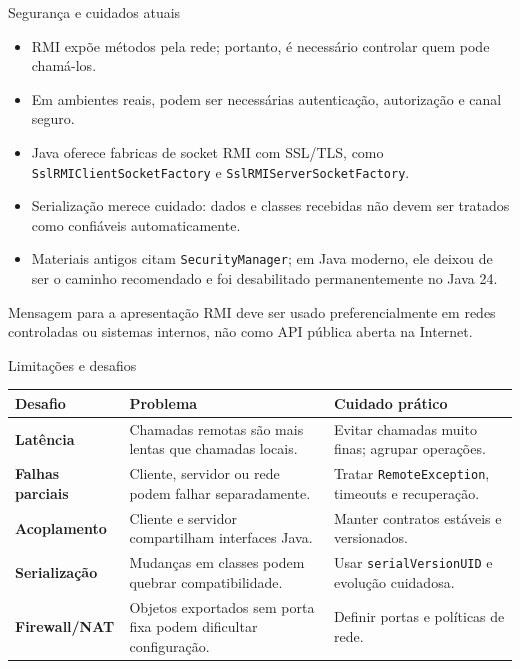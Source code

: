 \documentclass[aspectratio=169]{beamer}
\newcommand{\code}[1]{\texttt{#1}}
\begin{document}
\begin{frame}{Segurança e cuidados atuais}
    \begin{itemize}
        \item RMI expõe métodos pela rede; portanto, é necessário controlar quem pode chamá-los.
        \item Em ambientes reais, podem ser necessárias autenticação, autorização e canal seguro.
        \item Java oferece fabricas de socket RMI com SSL/TLS, como \code{SslRMIClientSocketFactory} e \code{SslRMIServerSocketFactory}.
        \item Serialização merece cuidado: dados e classes recebidas não devem ser tratados como confiáveis automaticamente.
        \item Materiais antigos citam \code{SecurityManager}; em Java moderno, ele deixou de ser o caminho recomendado e foi desabilitado permanentemente no Java 24.
    \end{itemize}

    \vspace{0.25cm}
    \begin{alertblock}{Mensagem para a apresentação}
        RMI deve ser usado preferencialmente em redes controladas ou sistemas internos, não como API pública aberta na Internet.
    \end{alertblock}
\end{frame}

\begin{frame}{Limitações e desafios}
    \begin{table}
        \small
        \renewcommand{\arraystretch}{1.25}
        \begin{tabular}{>{\bfseries}p{3.4cm}p{4.5cm}p{4.5cm}}
            \toprule
            Desafio & Problema & Cuidado prático \\
            \midrule
            Latência & Chamadas remotas são mais lentas que chamadas locais. & Evitar chamadas muito finas; agrupar operações. \\
            Falhas parciais & Cliente, servidor ou rede podem falhar separadamente. & Tratar \code{RemoteException}, timeouts e recuperação. \\
            Acoplamento & Cliente e servidor compartilham interfaces Java. & Manter contratos estáveis e versionados. \\
            Serialização & Mudanças em classes podem quebrar compatibilidade. & Usar \code{serialVersionUID} e evolução cuidadosa. \\
            Firewall/NAT & Objetos exportados sem porta fixa podem dificultar configuração. & Definir portas e políticas de rede. \\
            \bottomrule
        \end{tabular}
    \end{table}
\end{frame}
\end{document}
